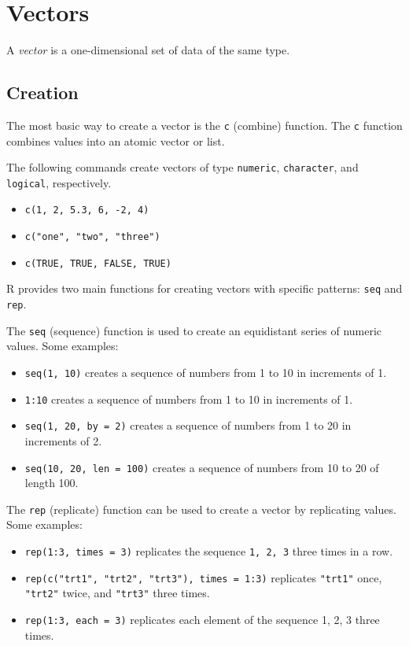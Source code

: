 \documentclass[
]{book}
\providecommand{\tightlist}{%
  \setlength{\itemsep}{0pt}\setlength{\parskip}{0pt}}
\theoremstyle{definition}
\theoremstyle{definition}
\theoremstyle{definition}
\theoremstyle{definition}
\theoremstyle{remark}
\begin{document}
\hypertarget{vectors}{%
\section{Vectors}\label{vectors}}

A \emph{vector} is a one-dimensional set of data of the same type.

\hypertarget{creation}{%
\subsection{Creation}\label{creation}}

The most basic way to create a vector is the \texttt{c} (combine) function. The \texttt{c} function combines values into an atomic vector or list.

The following commands create vectors of type \texttt{numeric}, \texttt{character}, and \texttt{logical}, respectively.

\begin{itemize}
\tightlist
\item
  \texttt{c(1,\ 2,\ 5.3,\ 6,\ -2,\ 4)}
\item
  \texttt{c("one",\ "two",\ "three")}
\item
  \texttt{c(TRUE,\ TRUE,\ FALSE,\ TRUE)}
\end{itemize}

R provides two main functions for creating vectors with specific patterns: \texttt{seq} and \texttt{rep}.

The \texttt{seq} (sequence) function is used to create an equidistant series of numeric values. Some examples:

\begin{itemize}
\tightlist
\item
  \texttt{seq(1,\ 10)} creates a sequence of numbers from 1 to 10 in increments of 1.
\item
  \texttt{1:10} creates a sequence of numbers from 1 to 10 in increments of 1.
\item
  \texttt{seq(1,\ 20,\ by\ =\ 2)} creates a sequence of numbers from 1 to 20 in increments of 2.
\item
  \texttt{seq(10,\ 20,\ len\ =\ 100)} creates a sequence of numbers from 10 to 20 of length 100.
\end{itemize}

The \texttt{rep} (replicate) function can be used to create a vector by replicating values. Some examples:

\begin{itemize}
\tightlist
\item
  \texttt{rep(1:3,\ times\ =\ 3)} replicates the sequence \texttt{1,\ 2,\ 3} three times in a row.
\item
  \texttt{rep(c("trt1",\ "trt2",\ "trt3"),\ times\ =\ 1:3)} replicates \texttt{"trt1"} once, \texttt{"trt2"} twice, and \texttt{"trt3"} three times.
\item
  \texttt{rep(1:3,\ each\ =\ 3)} replicates each element of the sequence 1, 2, 3 three times.
\end{itemize}
\end{document}
